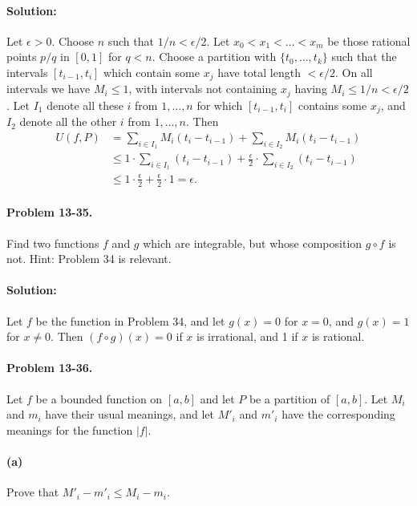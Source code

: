 \documentclass{article}
\begin{document}
\paragraph{Solution:} Let $\epsilon > 0$. Choose $n$ such that $1/n <
\epsilon/2$. Let $x_0 < x_1 < \ldots < x_m$ be those rational points $p/q$ in
$[0, 1]$ for $q < n$. Choose a partition with $\{t_0, \ldots, t_k\}$ such that
the intervals $[t_{i - 1}, t_i]$ which contain some $x_j$ have total length $<
\epsilon/2$. On all intervals we have $M_i \leq 1$, with intervals not
containing $x_j$ having $M_i \leq 1/n < \epsilon/2$. Let $I_1$ denote all
these $i$ from $1, \ldots, n$ for which $[t_{i - 1}, t_i]$ contains some $x_j$,
and $I_2$ denote all the other $i$ from $1, \ldots, n$. Then \begin{align*}
  U(f, P) &= \sum_{i \in I_1} M_i(t_i - t_{i - 1}) + \sum_{i \in I_2} M_i(t_i -
    t_{i - 1}) \\
    &\leq 1 \cdot \sum_{i \in I_1} (t_i - t_{i - 1}) + \frac{\epsilon}{2} \cdot
      \sum_{i \in I_2} (t_i - t_{i - 1}) \\
    &\leq 1 \cdot \frac{\epsilon}{2} + \frac{\epsilon}{2} \cdot 1 = \epsilon.
\end{align*}

\paragraph{Problem 13-35.} Find two functions $f$ and $g$ which are integrable,
but whose composition $g \circ f$ is not. Hint: Problem 34 is relevant.

\paragraph{Solution:} Let $f$ be the function in Problem 34, and let $g(x) = 0$
for $x = 0$, and $g(x) = 1$ for $x \neq 0$. Then $(f \circ g)(x) = 0$ if $x$ is
irrational, and 1 if $x$ is rational.

\paragraph{Problem 13-36.} Let $f$ be a bounded function on $[a, b]$ and let
$P$ be a partition of $[a, b]$. Let $M_i$ and $m_i$ have their usual meanings,
and let $M'_i$ and $m'_i$ have the corresponding meanings for the function
$|f|$.

\paragraph{(a)} Prove that $M'_i - m'_i \leq M_i - m_i$.
\end{document}
